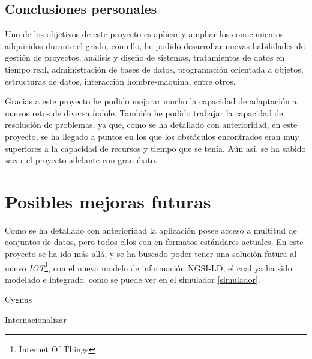 \subsection{Conclusiones personales}
Uno de los objetivos de este proyecto es aplicar y ampliar los conocimientos adquiridos durante el grado, con ello, he podido desarrollar nuevas habilidades de gestión de proyectos, análisis y diseño de sistemas, tratamientos de datos en tiempo real, administración de bases de datos, programación orientada a objetos, estructuras de datos, interacción hombre-maquina, entre otros.

Gracias a este proyecto he podido mejorar mucho la capacidad de adaptación a nuevos retos de diversa índole. También he podido trabajar la capacidad de resolución de problemas, ya que, como se ha detallado con anterioridad, en este proyecto, se ha llegado a puntos en los que los obstáculos encontrados eran muy superiores a la capacidad de recursos y tiempo que se tenía. Aún así, se ha sabido sacar el proyecto adelante con gran éxito.


\section{Posibles mejoras futuras}

Como se ha detallado con anterioridad la aplicación posee acceso a multitud de conjuntos de datos, pero todos ellos con en formatos estándares actuales. En este proyecto se ha ido más allá, y se ha buscado poder tener una solución futura al nuevo \textit{IOT}\footnote{Internet Of Things}, con el nuevo modelo de información NGSI-LD, el cual ya ha sido modelado e integrado, como se puede ver en el simulador \ref{simulador}.

Cygnus

Internacionalizar